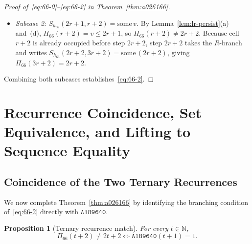 \documentclass[11pt]{article}
\newtheorem{proposition}[theorem]{Proposition}
\theoremstyle{definition}
\newcommand{\N}{\mathbb{N}}
\newcommand{\seq}[1]{\texttt{#1}}
\begin{document}
\begin{proof}[Proof of~\eqref{eq:66-0}--\eqref{eq:66-2} in Theorem~\ref{thm:a026166}]
\begin{itemize}
Now consider every intermediate step $v$ with $2r + 2 < v \le 6r + 1$:
\[
L_{66}(v) = \lfloor (v + 2)/2 \rfloor \le 3r + 1 < 3r + 2,
\]
and by strict monotonicity of $R_{66}$,
\[
R_{66}(v) \ge R_{66}(2r + 3) = 3r + 4 > 3r + 2.
\]
Hence cell $3r + 2$ is never targeted during steps $2r + 3, \dots, 6r + 1$, so Lemma~\ref{lem:lr-persist}(b) yields $S_{h_{66}}(6r + 1, 3r + 2) = \bot$. Finally, $L_{66}(6r + 2) = 3r + 2$, so step $6r + 2$ fills cell $3r + 2$ via the $L$-branch, giving $\Pi_{66}(3r + 2) = 6r + 2$.

\item \emph{Subcase 2: $S_{h_{66}}(2r + 1, r + 2) = \mathrm{some}\,v$.} By Lemma~\ref{lem:lr-persist}(a) and~(d), $\Pi_{66}(r + 2) = v \le 2r + 1$, so $\Pi_{66}(r + 2) \ne 2r + 2$. Because cell $r + 2$ is already occupied before step $2r + 2$, step $2r + 2$ takes the $R$-branch and writes $S_{h_{66}}(2r + 2, 3r + 2) = \mathrm{some}\,(2r + 2)$, giving $\Pi_{66}(3r + 2) = 2r + 2$.
\end{itemize}
Combining both subcases establishes~\eqref{eq:66-2}.
\end{proof}

\section{Recurrence Coincidence, Set Equivalence, and Lifting to Sequence Equality}
\label{sec:main}

\subsection{Coincidence of the Two Ternary Recurrences}

We now complete Theorem~\ref{thm:a026166} by identifying the branching condition of~\eqref{eq:66-2} directly with $\seq{A189640}$.

\begin{proposition}[Ternary recurrence match]
\label{prop:rec-match}
For every $t \in \N$,
\[
\Pi_{66}(t + 2) \ne 2t + 2 \iff \seq{A189640}(t + 1) = 1.
\]
\end{proposition}
\end{document}
